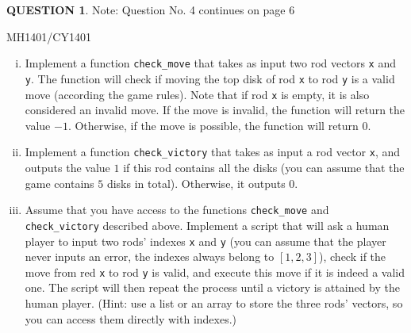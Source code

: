 \documentclass[a4paper,12pt]{article}
\theoremstyle{definition}
\newtheorem{ques}[dummy]{QUESTION}
\theoremstyle{plain}
\newcommand{\ttx}[1]{\texttt{#1}}
\begin{document}
\begin{ques}
	\quad Note: Question No. 4 continues on page 6
	
	\newpage
	
	\hfill MH1401/CY1401\vspace*{0.5em}
	
	\begin{enumerate}[(i)]
		\item Implement a function \ttx{check\_move} that takes as input two rod vectors \ttx{x} and \ttx{y}. The function will check if moving the top disk of rod \ttx{x} to rod \ttx{y} is a valid move (according the game rules). Note that if rod \ttx{x} is empty, it is also considered an invalid move. If the move is invalid, the function will return the value $-1$. Otherwise, if the move is possible, the function will return $0$.
		
		\item Implement a function \ttx{check\_victory} that takes as input a rod vector \ttx{x}, and outputs the value $1$ if this rod contains all the disks (you can assume that the game contains $5$ disks in total). Otherwise, it outputs $0$.
		
		\item Assume that you have access to the functions \ttx{check\_move} and \ttx{check\_victory} described above. Implement a script that will ask a human player to input two rods' indexes \ttx{x} and \ttx{y} (you can assume that the player never inputs an error, the indexes always belong to $[1,2,3]$), check if the move from red \ttx{x} to rod \ttx{y} is valid, and execute this move if it is indeed a valid one. The script will then repeat the process until a victory is attained by the human player. (Hint: use a list or an array to store the three rods' vectors, so you can access them directly with indexes.)
	\end{enumerate}
\end{ques}
\end{document}
